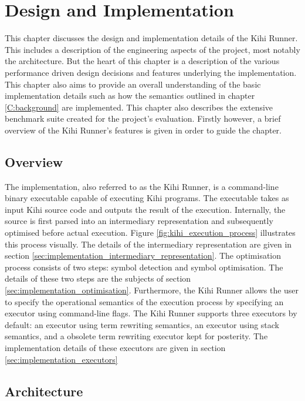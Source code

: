 \chapter{Design and Implementation} \label{C:implementation} 

This chapter discusses the design and implementation details of the Kihi Runner. This includes a description of the engineering aspects of the project, most notably the architecture. But the heart of this chapter is a description of the various performance driven design decisions and features underlying the implementation. This chapter also aims to provide an overall understanding of the basic implementation details such as how the semantics outlined in chapter \ref{C:background} are implemented. This chapter also describes the extensive benchmark suite created for the project's evaluation. Firstly however, a brief overview of the Kihi Runner's features is given in order to guide the chapter.

\section{Overview}

The implementation, also referred to as the Kihi Runner, is a command-line binary executable capable of executing Kihi programs. The executable takes as input Kihi source code and outputs the result of the execution. Internally, the source is first parsed into an intermediary representation and subsequently optimised before actual execution. Figure \ref{fig:kihi_execution_process} illustrates this process visually. The details of the intermediary representation are given in section \ref{sec:implementation_intermediary_representation}. The optimisation process consists of two steps: symbol detection and symbol optimisation. The details of these two steps are the subjects of section \ref{sec:implementation_optimisation}. Furthermore, the Kihi Runner allows the user to specify the operational semantics of the execution process by specifying an executor using command-line flags. The Kihi Runner supports three executors by default: an executor using term rewriting semantics, an executor using stack semantics, and a obsolete term rewriting executor kept for posterity. The implementation details of these executors are given in section \ref{sec:implementation_executors}

\section{Architecture}


